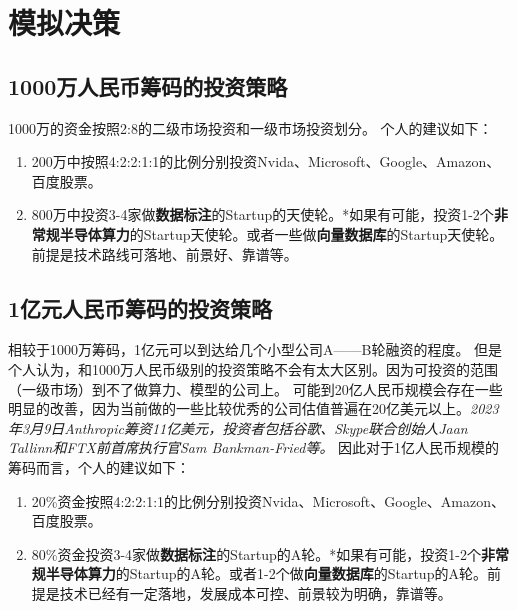\section{模拟决策}
\subsection{1000万人民币筹码的投资策略}
1000万的资金按照2:8的二级市场投资和一级市场投资划分。
个人的建议如下：
\begin{enumerate}
    \item 200万中按照4:2:2:1:1的比例分别投资Nvida、Microsoft、Google、Amazon、百度股票。
    \item 800万中投资3-4家做\textbf{数据标注}的Startup的天使轮。*如果有可能，投资1-2个\textbf{非常规半导体算力}的Startup天使轮。或者一些做\textbf{向量数据库}的Startup天使轮。前提是技术路线可落地、前景好、靠谱等。
\end{enumerate}

\subsection{1亿元人民币筹码的投资策略}
相较于1000万筹码，1亿元可以到达给几个小型公司A——B轮融资的程度。
但是个人认为，和1000万人民币级别的投资策略不会有太大区别。因为可投资的范围（一级市场）到不了做算力、模型的公司上。
可能到20亿人民币规模会存在一些明显的改善，因为当前做的一些比较优秀的公司估值普遍在20亿美元以上。\textit{2023年3月9日Anthropic筹资11亿美元，投资者包括谷歌、Skype联合创始人Jaan Tallinn和FTX前首席执行官Sam Bankman-Fried等。}
因此对于1亿人民币规模的筹码而言，个人的建议如下：
\begin{enumerate}
    \item 20\%资金按照4:2:2:1:1的比例分别投资Nvida、Microsoft、Google、Amazon、百度股票。
    \item 80\%资金投资3-4家做\textbf{数据标注}的Startup的A轮。*如果有可能，投资1-2个\textbf{非常规半导体算力}的Startup的A轮。或者1-2个做\textbf{向量数据库}的Startup的A轮。前提是技术已经有一定落地，发展成本可控、前景较为明确，靠谱等。
\end{enumerate}













